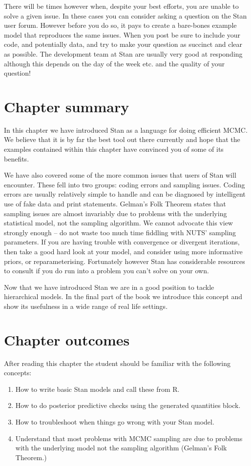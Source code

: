 \documentclass[11pt,fullpage]{book}
\begin{document}
There will be times however when, despite your best efforts, you are unable to solve a given issue. In these cases you can consider asking a question on the Stan user forum. However before you do so, it pays to create a bare-bones example model that reproduces the same issues. When you post be sure to include your code, and potentially data, and try to make your question as succinct and clear as possible. The development team at Stan are usually very good at responding although this depends on the day of the week etc. and the quality of your question!

\section{Chapter summary}
In this chapter we have introduced Stan as a language for doing efficient MCMC. We believe that it is by far the best tool out there currently and hope that the examples contained within this chapter have convinced you of some of its benefits. 

We have also covered some of the more common issues that users of Stan will encounter. These fell into two groups: coding errors and sampling issues. Coding errors are usually relatively simple to handle and can be diagnosed by intelligent use of fake data and print statements. Gelman's Folk Theorem states that sampling issues are almost invariably due to problems with the underlying statistical model, not the sampling algorithm. We cannot advocate this view strongly enough -- do not waste too much time fiddling with NUTS' sampling parameters. If you are having trouble with convergence or divergent iterations, then take a good hard look at your model, and consider using more informative priors, or reparameterising. Fortunately however Stan has considerable resources to consult if you do run into a problem you can't solve on your own. 

Now that we have introduced Stan we are in a good position to tackle hierarchical models. In the final part of the book we introduce this concept and show its usefulness in a wide range of real life settings.

\section{Chapter outcomes}
After reading this chapter the student should be familiar with the following concepts:
%
\begin{enumerate}
\item How to write basic Stan models and call these from R.
\item How to do posterior predictive checks using the generated quantities block.
\item How to troubleshoot when things go wrong with your Stan model.
\item Understand that most problems with MCMC sampling are due to problems with the underlying model not the sampling algorithm (Gelman's Folk Theorem.)
\end{enumerate}
\end{document}
